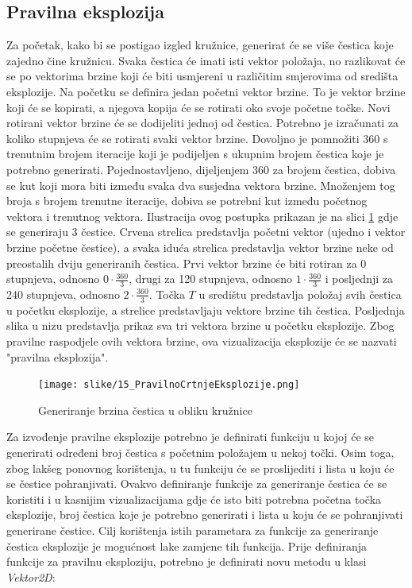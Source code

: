 \documentclass{foi}
\begin{document}
\subsection{Pravilna eksplozija}
Za početak, kako bi se postigao izgled kružnice, generirat će se više čestica koje zajedno čine kružnicu. Svaka čestica će imati isti vektor položaja, no razlikovat će se po vektorima brzine koji će biti usmjereni u različitim smjerovima od središta eksplozije. Na početku se definira jedan početni vektor brzine. To je vektor brzine koji će se kopirati, a njegova kopija će se rotirati oko svoje početne točke. Novi rotirani vektor brzine će se dodijeliti jednoj od čestica. Potrebno je izračunati za koliko stupnjeva će se rotirati svaki vektor brzine. Dovoljno je pomnožiti 360 s trenutnim brojem iteracije koji je podijeljen s ukupnim brojem čestica koje je potrebno generirati. Pojednostavljeno, dijeljenjem 360 za brojem čestica, dobiva se kut koji mora biti između svaka dva susjedna vektora brzine. Množenjem tog broja s brojem trenutne iteracije, dobiva se potrebni kut između početnog vektora i trenutnog vektora. Ilustracija ovog postupka prikazan je na slici \ref{fig:PravilnoCrtnjeEksplozije} gdje se generiraju 3 čestice. Crvena strelica predstavlja početni vektor (ujedno i vektor brzine početne čestice), a svaka iduća strelica predstavlja vektor brzine neke od preostalih dviju generiranih čestica. Prvi vektor brzine će biti rotiran za 0 stupnjeva, odnosno $0 \cdot \frac{360}{3}$, drugi za 120 stupnjeva, odnosno $1 \cdot \frac{360}{3}$ i posljednji za 240 stupnjeva, odnosno $2 \cdot \frac{360}{3}$. Točka $T$ u središtu predstavlja položaj svih čestica u početku eksplozije, a strelice predstavljaju vektore brzine tih čestica. Posljednja slika u nizu predstavlja prikaz sva tri vektora brzine u početku eksplozije. Zbog pravilne raspodjele ovih vektora brzine, ova vizualizacija eksplozije će se nazvati "pravilna eksplozija".

\begin{figure}[H]
    \centering
    \texttt{[image: slike/15\_PravilnoCrtnjeEksplozije.png]}
    \captionsetup{justification=centering}
    \caption{Generiranje brzina čestica u obliku kružnice}
\label{fig:PravilnoCrtnjeEksplozije}
\end{figure}

Za izvođenje pravilne eksplozije potrebno je definirati funkciju u kojoj će se generirati određeni broj čestica s početnim položajem u nekoj točki. Osim toga, zbog lakšeg ponovnog korištenja, u tu funkciju će se proslijediti i lista u koju će se čestice pohranjivati. Ovakvo definiranje funkcije za generiranje čestica će se koristiti i u kasnijim vizualizacijama gdje će isto biti potrebna početna točka eksplozije, broj čestica koje je potrebno generirati i lista u koju će se pohranjivati generirane čestice. Cilj korištenja istih parametara za funkcije za generiranje čestica eksplozije je mogućnost lake zamjene tih funkcija. Prije definiranja funkcije za pravilnu eksploziju, potrebno je definirati novu metodu u klasi \textit{Vektor2D}:
\end{document}
